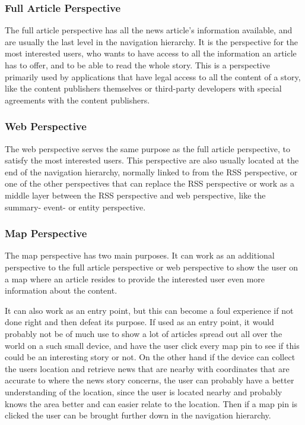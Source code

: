 \subsubsection{Full Article Perspective}
The full article perspective has all the news article's information available, and are usually the last level in the navigation hierarchy. It is the perspective for the most interested users, who wants to have access to all the information an article has to offer, and to be able to read the whole story. This is a perspective primarily used by applications that have legal access to all the content of a story, like the content publishers themselves or third-party developers with special agreements with the content publishers.

\subsubsection{Web Perspective}
The web perspective serves the same purpose as the full article perspective, to satisfy the most interested users. This perspective are also usually located at the end of the navigation hierarchy, normally linked to from the RSS perspective, or one of the other perspectives that can replace the RSS perspective or work as a middle layer between the RSS perspective and web perspective, like the summary- event- or entity perspective.


\subsubsection{Map Perspective}
The map perspective has two main purposes. It can work as an additional perspective to the full article perspective or web perspective to show the user on a map where an article resides to provide the interested user even more information about the content.

It can also work as an entry point, but this can become a foul experience if not done right and then defeat its purpose. If used as an entry point, it would probably not be of much use to show a lot of articles spread out all over the world on a such small device, and have the user click every map pin to see if this could be an interesting story or not. On the other hand if the device can collect the users location and retrieve news that are nearby with coordinates that are accurate to where the news story concerns, the user can probably have a better understanding of the location, since the user is located nearby and probably knows the area better and can easier relate to the location. Then if a map pin is clicked the user can be brought further down in the navigation hierarchy.


